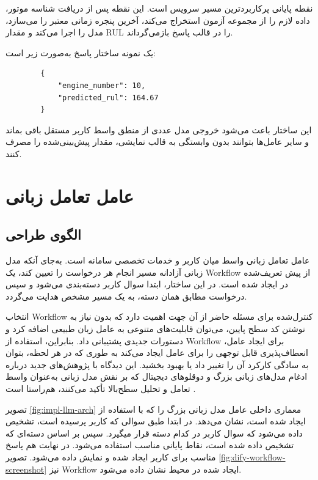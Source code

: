 نقطه پایانی  پرکاربردترین مسیر سرویس است. این نقطه پس از دریافت شناسه موتور، داده لازم را از مجموعه آزمون استخراج می‌کند، آخرین پنجره زمانی معتبر را می‌سازد، مدل را اجرا می‌کند و مقدار \gls{RUL} را در قالب پاسخ  بازمی‌گرداند.

یک نمونه ساختار پاسخ به‌صورت زیر است:

\begin{latin}
	\begin{verbatim}
		{
			"engine_number": 10,
			"predicted_rul": 164.67
		}
	\end{verbatim}
\end{latin}

این ساختار باعث می‌شود خروجی مدل عددی از منطق واسط کاربر مستقل باقی بماند و سایر عامل‌ها بتوانند بدون وابستگی به قالب نمایشی، مقدار پیش‌بینی‌شده را مصرف کنند.


\section{عامل تعامل زبانی}
\label{sec:impl-llm}

\subsection{الگوی طراحی}

عامل تعامل زبانی واسط میان کاربر و خدمات تخصصی سامانه است. به‌جای آنکه مدل زبانی آزادانه مسیر انجام هر درخواست را تعیین کند، یک \gls{Workflow} از پیش تعریف‌شده در  ایجاد شده است. در این ساختار، ابتدا سوال کاربر دسته‌بندی می‌شود و سپس درخواست مطابق همان دسته، به یک مسیر مشخص هدایت می‌گردد.

انتخاب \gls{Workflow} کنترل‌شده برای مسئله حاضر از آن جهت اهمیت دارد که بدون نیاز به نوشتن کد سطح پایین، می‌توان قابلیت‌های متنوعی به عامل زبان طبیعی اضافه کرد و دستورات جدیدی پشتیبانی داد. بنابراین، استفاده از \gls{Workflow} برای ایجاد عامل،‌ انعطاف‌پذیری قابل توجهی را برای عامل ایجاد می‌کند به طوری که در هر لحظه،‌ بتوان به سادگی کارکرد آن را تغییر داد یا بهبود بخشید. این دیدگاه با پژوهش‌های جدید درباره ادغام مدل‌های زبانی بزرگ و دوقلوهای دیجیتال که بر نقش مدل زبانی به‌عنوان واسط تعامل و تحلیل سطح‌بالا تأکید می‌کنند، هم‌راستا است \cite{CHEN2025102982LLMDT}.

تصویر
\ref{fig:impl-llm-arch}
معماری داخلی عامل مدل زبانی بزرگ را که با استفاده از  ایجاد شده است، نشان می‌دهد. در ابتدا طبق سوالی که کاربر پرسیده است، تشخیص داده می‌شود که سوال کاربر در کدام دسته قرار میگیرد. سپس بر اساس دسته‌ای که تشخیص داده شده است، نقاط پایانی مناسب استفاده می‌شود. در نهایت هم پاسخ مناسب برای کاربر ایجاد شده و نمایش داده می‌شود.
تصویر 
\ref{fig:dify-workflow-screenshot}
نیز \gls{Workflow} ایجاد شده در محیط  نشان داده می‌شود.

